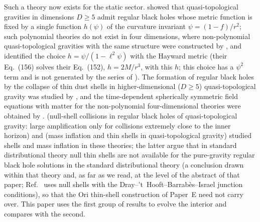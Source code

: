 \documentclass[11pt]{article}
\begin{document}
Such a theory now exists for the static sector. \citet{BuenoCanoHennigar2024} showed that quasi-topological gravities in dimensions $D\ge5$ admit regular black holes whose metric function is fixed by a single function $h(\psi)$ of the curvature invariant $\psi=(1-f)/r^{2}$; such polynomial theories do not exist in four dimensions, where non-polynomial quasi-topological gravities with the same structure were constructed by \citet{BuenoCanoHennigarMurcia2025}, and \citet{BorissovaCarballoRubio2026} identified the choice $h=\psi/(1-\ell^{2}\psi)$ with the Hayward metric (their Eq.~(156) solves their Eq.~(152), $h=2M/r^{3}$, with this $h$; this choice has a $\psi^{2}$ term and is not generated by the series of \citealt{BuenoCanoHennigarMurcia2025}). The formation of regular black holes by the collapse of thin dust shells in higher-dimensional ($D\ge5$) quasi-topological gravity was studied by \citet{BuenoCanoHennigarMurcia2024}, and the time-dependent spherically symmetric field equations with matter for the non-polynomial four-dimensional theories were obtained by \citet{BuenoCanoHennigarMurcia2025}. \citet{FrolovZelnikov2026} (null-shell collisions in regular black holes of quasi-topological gravity: large amplification only for collisions extremely close to the inner horizon) and \citet{DiFilippo2026} (mass inflation and thin shells in quasi-topological gravity) studied shells and mass inflation in these theories; the latter argue that in standard distributional theory null thin shells are not available for the pure-gravity regular black hole solutions in the standard distributional theory (a conclusion drawn within that theory and, as far as we read, at the level of the abstract of that paper; Ref.~\cite{FrolovZelnikov2026} uses null shells with the Dray--'t~Hooft--Barrab\`es--Israel junction conditions), so that the Ori thin-shell construction of Paper~E need not carry over. This paper uses the first group of results to evolve the interior and compares with the second.
\end{document}
